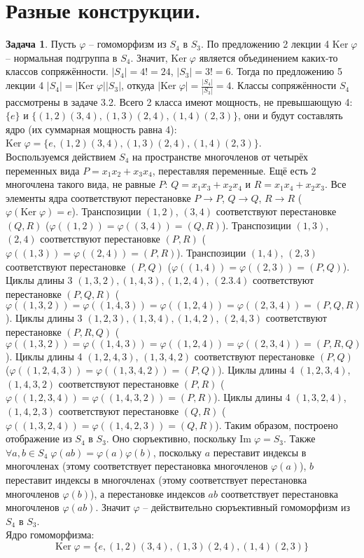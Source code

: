 \documentclass[12pt]{article}
\theoremstyle{definition}
\newtheorem{zad}{Задача}[section]
\begin{document}
\section{Разные конструкции.}
\begin{zad}
Пусть $\varphi$ -- гомоморфизм из $S_4$ в $S_3$. По предложению 2 лекции 4 $\text{Ker}\;\varphi$ -- нормальная подгруппа в $S_4$. Значит, $\text{Ker}\;\varphi$ является объединением каких-то классов сопряжённости. $|S_4|=4!=24$, $|S_3|=3!=6$. Тогда по предложению 5 лекции 4 $|S_4|=|\text{Ker}\;\varphi||S_3|$, откуда $|\text{Ker}\;\varphi|=\frac{|S_4|}{|S_3|}=4$. Классы сопряжённости $S_4$ рассмотрены в задаче 3.2. Всего 2 класса имеют мощность, не превышающую 4: $\{e\}$ и $\{(1,2)(3,4),(1,3)(2,4),(1,4)(2,3)\}$, они и будут составлять ядро (их суммарная мощность равна 4): $\text{Ker}\;\varphi=\{e,(1,2)(3,4),(1,3)(2,4),(1,4)(2,3)\}$.\\
Воспользуемся действием $S_4$ на пространстве многочленов от четырёх переменных вида $P=x_1x_2+x_3x_4$, переставляя переменные. Ещё есть 2 многочлена такого вида, не равные $P$: $Q=x_1x_3+x_2x_4$ и $R=x_1x_4+x_2x_3$. Все элементы ядра соответствуют перестановке $P\rightarrow P$, $Q\rightarrow Q$, $R\rightarrow R$ ($\varphi(\text{Ker}\;\varphi)=e$). Транспозиции $(1,2)$, $(3,4)$ соответствуют перестановке $(Q,R)$ ($\varphi((1,2))=\varphi((3,4))=(Q,R)$). Транспозиции $(1,3)$, $(2,4)$ соответствуют перестановке $(P,R)$ ($\varphi((1,3))=\varphi((2,4))=(P,R)$). Транспозиции $(1,4)$, $(2,3)$ соответствуют перестановке $(P,Q)$ ($\varphi((1,4))=\varphi((2,3))=(P,Q)$). Циклы длины 3 $(1,3,2), (1,4,3), (1,2,4)$, $(2.3.4)$ соответствуют перестановке $(P,Q,R)$ ($\varphi((1,3,2))=\varphi((1,4,3))=\varphi((1,2,4))=\varphi((2,3,4))=(P,Q,R)$). Циклы длины 3 $(1,2,3), (1,3,4), (1,4,2)$, $(2,4,3)$ соответствуют перестановке $(P,R,Q)$ ($\varphi((1,3,2))=\varphi((1,4,3))=\varphi((1,2,4))=\varphi((2,3,4))=(P,R,Q)$). Циклы длины 4 $(1,2,4,3)$, $(1,3,4,2)$ соответствуют перестановке $(P,Q)$ ($\varphi((1,2,4,3))=\varphi((1,3,4,2))=(P,Q)$). Циклы длины 4 $(1,2,3,4)$, $(1,4,3,2)$ соответствуют перестановке $(P,R)$ ($\varphi((1,2,3,4))=\varphi((1,4,3,2))=(P,R)$). Циклы длины 4 $(1,3,2,4)$, $(1,4,2,3)$ соответствуют перестановке $(Q,R)$ ($\varphi((1,3,2,4))=\varphi((1,4,2,3))=(Q,R)$). Таким образом, построено отображение из $S_4$ в $S_3$. Оно сюръективно, поскольку $\text{Im}\;\varphi=S_3$. Также $\forall a,b\in S_4\;\varphi(ab)=\varphi(a)\varphi(b)$, поскольку $a$ переставит индексы в многочленах (этому соответствует перестановка многочленов $\varphi(a)$), $b$ переставит индексы в многочленах (этому соответствует перестановка многочленов $\varphi(b)$), а перестановке индексов $ab$ соответствует перестановка многочленов $\varphi(ab)$. Значит $\varphi$ -- действительно сюръективный гомоморфизм из $S_4$ в $S_3$.\\
Ядро гомоморфизма:
\begin{equation}
    \boxed{\text{Ker}\;\varphi=\{e,(1,2)(3,4),(1,3)(2,4),(1,4)(2,3)\}}
\end{equation}
\end{zad}
\end{document}
